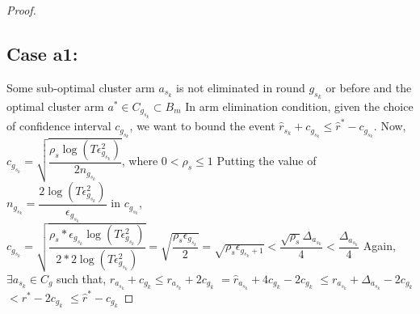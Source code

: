 \begin{proof}
\subsection{Case a1:} 
Some sub-optimal cluster arm $a_{s_{k}}$ is not eliminated in round $g_{s_{k}}$ or before and the optimal cluster arm $a^{*}\in C_{g_{s_{k}}} \subset B_{m}$
\newline In arm elimination condition, given the choice of confidence interval $c_{g_{s_{k}}}$, we want to bound the event $\hat{r}_{s_{k}}+c_{g_{s_{k}}}\leq \hat{r}^{*}-c_{g_{s_{k}}}$.
\newline Now, $c_{g_{s_{k}}}=\sqrt{\dfrac{\rho_{s} \log (T\epsilon_{g_{s_{k}}}^{2})}{2 n_{g_{s_{k}}}}}$, where $0 < \rho_{s}\leq 1$
\newline Putting the value of $n_{g_{s_{k}}}=\dfrac{2\log{(T\epsilon_{g_{s_{k}}}^{2})}}{\epsilon_{g_{s_{k}}}}$ in $c_{g_{s_{k}}}$,
\newline $c_{g_{s_{k}}}=\sqrt{\dfrac{\rho_{s}*\epsilon_{g_{s_{k}}}\log (T\epsilon_{g_{s_{k}}}^{2})}{2*2 \log(T\epsilon_{g_{s_{k}}}^{2})}}=\sqrt{\dfrac{\rho_{s}\epsilon_{g_{s_{k}}}}{2}} = \sqrt{\rho_{s}\epsilon_{g_{s_{k}}+1}} < \dfrac{\sqrt{\rho_{s}}\Delta_{a_{s_{k}}}}{4} < \dfrac{\Delta_{a_{s_{k}}}}{4} $
\newline Again, $\exists a_{s_{k}} \in C_{g}$ such that, 
$\hat{r}_{a_{s_{k}}} + c_{g_{k}}\leq r_{a_{s_{k}}} + 2c_{g_{k}} $
\newline\hspace*{14em}$= \hat{r}_{a_{s_{k}}} + 4c_{g_{k}} - 2c_{g_{k}} $
\newline\hspace*{14em}$\leq r_{a_{s_{k}}} + \Delta_{a_{s_{k}}} - 2c_{g_{k}}$
\newline\hspace*{14em}$< r^{*} -2c_{g_{k}} $
\newline\hspace*{14em}$\leq \hat{r}^{*} - c_{g_{k}}$

\end{proof}
